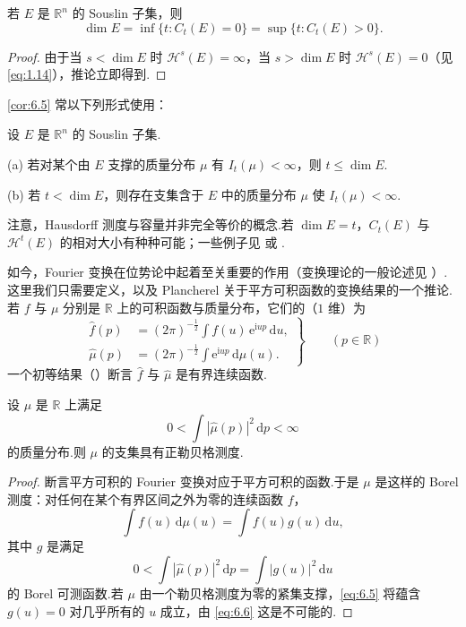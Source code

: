 \begin{corollary}\label{cor:6.5}
若 $E$ 是 $\mathbb{R}^n$ 的 Souslin 子集，则
\[
  \dim E=\inf\{t:C_t(E)=0\}=\sup\{t:C_t(E)>0\}.
\]
\end{corollary}

\begin{proof}
由于当 $s<\dim E$ 时 $\mathcal{H}^s(E)=\infty$，当 $s>\dim E$ 时 $\mathcal{H}^s(E)=0$（见 \eqref{eq:1.14}），推论立即得到.
\end{proof}

\cref{cor:6.5} 常以下列形式使用：

\begin{corollary}\label{cor:6.6}
设 $E$ 是 $\mathbb{R}^n$ 的 Souslin 子集.

(a) 若对某个由 $E$ 支撑的质量分布 $\mu$ 有 $I_t(\mu)<\infty$，则 $t\leq\dim E$.

(b) 若 $t<\dim E$，则存在支集含于 $E$ 中的质量分布 $\mu$ 使 $I_t(\mu)<\infty$.
\end{corollary}

注意，Hausdorff 测度与容量并非完全等价的概念.若 $\dim E=t$，$C_t(E)$ 与 $\mathcal{H}^t(E)$ 的相对大小有种种可能；一些例子见 \textcite{garnett1970} 或 \textcite{mattila1984c}.

如今，Fourier 变换在位势论中起着至关重要的作用（变换理论的一般论述见 \textcite{rudin1973}）.这里我们只需要定义，以及 Plancherel 关于平方可积函数的变换结果的一个推论.若 $f$ 与 $\mu$ 分别是 $\mathbb{R}$ 上的可积函数与质量分布，它们的（$1$ 维）为
\[
  \left.
  \begin{aligned}
    \hat{f}(p)&=(2\pi)^{-\frac{1}{2}}\int f(u)\,\mathrm{e}^{\mathrm{i}up}\,\mathrm{d}u,\\
    \hat{\mu}(p)&=(2\pi)^{-\frac{1}{2}}\int\mathrm{e}^{\mathrm{i}up}\,\mathrm{d}\mu(u).
  \end{aligned}
  \right\}\qquad(p\in\mathbb{R})
\]
一个初等结果（）断言 $\hat{f}$ 与 $\hat{\mu}$ 是有界连续函数.

\begin{lemma}\label{lem:6.7}
设 $\mu$ 是 $\mathbb{R}$ 上满足
\[
  0<\int|\hat{\mu}(p)|^{2}\,\mathrm{d}p<\infty
\]
的质量分布.则 $\mu$ 的支集具有正勒贝格测度.
\end{lemma}

\begin{proof}
断言平方可积的 Fourier 变换对应于平方可积的函数.于是 $\mu$ 是这样的 Borel 测度：对任何在某个有界区间之外为零的连续函数 $f$，
\begin{equation}\label{eq:6.5}
  \int f(u)\,\mathrm{d}\mu(u)=\int f(u)g(u)\,\mathrm{d}u,
\end{equation}
其中 $g$ 是满足
\begin{equation}\label{eq:6.6}
  0<\int|\hat{\mu}(p)|^{2}\,\mathrm{d}p=\int|g(u)|^{2}\,\mathrm{d}u
\end{equation}
的 Borel 可测函数.若 $\mu$ 由一个勒贝格测度为零的紧集支撑，\eqref{eq:6.5} 将蕴含 $g(u)=0$ 对几乎所有的 $u$ 成立，由 \eqref{eq:6.6} 这是不可能的.
\end{proof}

